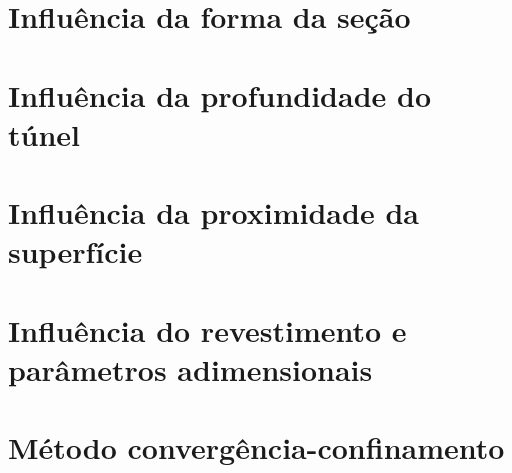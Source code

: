 \section{Influência da forma da seção}

\section{Influência da profundidade do túnel}

\section{Influência da proximidade da superfície}

\section{Influência do revestimento e parâmetros adimensionais}

\section{Método convergência-confinamento}




